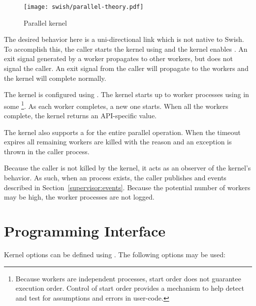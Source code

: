 \begin{figure}
  \center\texttt{[image: swish/parallel-theory.pdf]}
  \caption{\label{fig:parallel}Parallel kernel}
\end{figure}

The desired behavior here is a uni-directional link which is not
native to Swish. To accomplish this, the caller starts the kernel
using  and the kernel enables
. An exit signal generated by a worker
propagates to other workers, but does not signal the caller. An exit
signal from the caller will propagate to the workers and the kernel
will complete normally.

The kernel is configured using . The kernel
starts up to  worker processes using
 in some \footnote{Because workers are
independent processes, start order does not guarantee execution
order. Control of start order provides a mechanism to help detect and
test for assumptions and errors in user-code.}. As each worker
completes, a new one starts. When all the workers complete, the kernel
returns an API-specific value.

The kernel also supports a  for the entire parallel
operation. When the timeout expires all remaining workers are killed
with the reason  and an exception is thrown in the
caller process.

Because the caller is not killed by the kernel, it acts as an observer
of the kernel's behavior. As such, when an  process
exists, the caller publishes  and
 events described in
Section~\ref{supervisor:events}. Because the potential number of
workers may be high, the worker processes are not logged.

\section {Programming Interface}

Kernel options can be defined using
.
The following options may be used:
\label{parallel:options}

